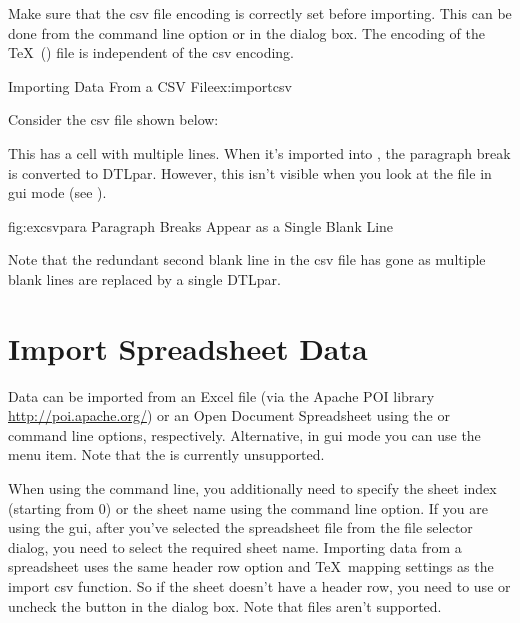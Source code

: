    Make sure that the \gls{csv} file encoding is correctly set
   before importing. This can be done from the 
   command line option or in the 
    dialog box. The encoding
   of the \TeX\ () file is independent of the \gls{csv}
   encoding.

\begin{example}{Importing Data From a CSV File}{ex:importcsv}

   Consider the \gls{csv} file shown below:


   This has a cell with multiple lines. When it's imported into
   , the paragraph break is converted to \gls{DTLpar}.
   However, this isn't visible when you look at the file in 
   \gls{gui} mode (see ).

\FloatFig
 {fig:excsvpara}
 {%
 }
 {Paragraph Breaks Appear as a Single Blank Line}

   Note that the redundant second blank line in the \gls{csv} file
   has gone as multiple blank lines are replaced by a single
   \gls{DTLpar}.
\end{example}

\section{Import Spreadsheet Data}\label{sec:importspread}

   Data can be imported from an Excel  file (via the 
   Apache POI library \url{http://poi.apache.org/})
   or an Open Document Spreadsheet using the
    or  command line options, respectively.
   Alternative, in \gls{gui} mode you can use the 
    menu item.
   Note that the  is currently unsupported.

 When using the command line,
   you additionally need to specify the sheet index (starting from 0) or the 
   sheet name using the  command line option. If you are 
   using the \gls{gui}, after you've selected the spreadsheet file 
   from the file selector dialog, you need to select the required sheet 
   name.
Importing data from a spreadsheet uses the same header row option and 
   \TeX\ mapping settings as the import \gls{csv} function. 
   So if the sheet doesn't have a header row, you need to use
    or uncheck the
 button 
   in the  dialog box. Note that 
    files aren't supported.


